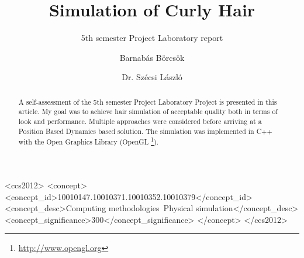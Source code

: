 \documentclass[sigplan,screen,nonacm]{acmart}
\begin{document}
\title[Hair Simulation]{Simulation of Curly Hair}
\subtitle{5th semester Project Laboratory report}

\author{Barnabás Börcsök}

\author{Dr. Szécsi László}



\begin{abstract}
    A self-assessment of the 5th semester Project Laboratory
    Project is presented in this article. My goal was to achieve hair simulation
    of acceptable quality both in terms of look and performance. Multiple
    approaches were considered before arriving at a Position Based Dynamics
    based solution. The simulation was implemented in C++ with the Open Graphics
    Library (OpenGL \footnote{\url{http://www.opengl.org}}). 
\end{abstract}

\begin{CCSXML}
<ccs2012>
<concept>
<concept_id>10010147.10010371.10010352.10010379</concept_id>
<concept_desc>Computing methodologies~Physical simulation</concept_desc>
<concept_significance>300</concept_significance>
</concept>
</ccs2012>
\end{CCSXML}
\end{document}
